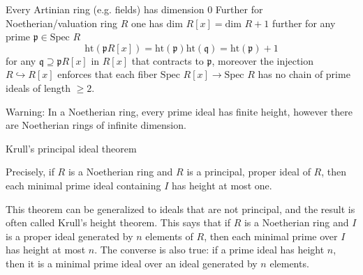 Every Artinian ring (e.g. fields) has dimension \( 0 \)
Further for Noetherian/valuation ring \( R \) one has
\( \text{dim } R[x] = \text{dim } R + 1 \)
further for any prime \( \mathfrak{p} \in \text{Spec } R \)
\[
    \text{ht}(\mathfrak{p}R[x]) = \text{ht} ( \mathfrak{p} )
    \text{ht}(\mathfrak{q}) = \text{ht} ( \mathfrak{p} ) + 1
\]
for any \( \mathfrak{q} \supseteq \mathfrak{p}R[x] \) in \( R[x] \) that contracts to \( \mathfrak{p} \),
moreover the injection \( R \hookrightarrow R[x] \) enforces that each fiber \( \text{Spec } R[x] \to \text{Spec } R \)
has no chain of prime ideals of length \( \geq 2 \).

Warning:
In a Noetherian ring, every prime ideal has finite height, however there are Noetherian rings of infinite dimension.

Krull's principal ideal theorem

Precisely, if \( R \) is a Noetherian ring and \( R \) is a principal, proper ideal of \( R \), then each minimal prime ideal containing \( I \) 
has height at most one.

This theorem can be generalized to ideals that are not principal, and the result is often called Krull's height theorem.  
This says that if \( R \) is a Noetherian ring and \( I \) is a proper ideal generated by \( n \) elements of \( R \), 
then each minimal prime over \( I \) has height at most \( n \). 
The converse is also true: if a prime ideal has height \( n \), then it is a minimal prime ideal over an ideal generated by \( n \) elements.

